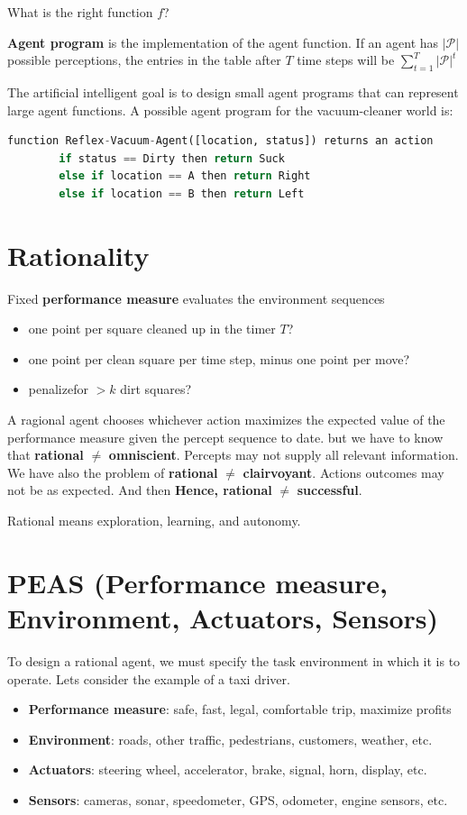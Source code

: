 What is the right function $f$?
\begin{tcolorbox}[title = {Agent Programs vs Agent functions}]
    \textbf{Agent program} is the implementation of the agent function.
    If an agent has $|\mathcal{P}|$ possible perceptions, the entries
    in the table after $T$ time steps will be 
    $
    \sum_{t=1}^{T} | \mathcal{P}|^t
    $
\end{tcolorbox}
The artificial intelligent goal is to design small agent programs that 
can represent large agent functions.
A possible agent program for the vacuum-cleaner world is:
\begin{lstlisting}[language=Python, basicstyle=\small]
    function Reflex-Vacuum-Agent([location, status]) returns an action
        if status == Dirty then return Suck
        else if location == A then return Right
        else if location == B then return Left
\end{lstlisting}
\section{Rationality}
Fixed \textbf{performance measure} evaluates the environment sequences
\begin{itemize}
    \item one point per square cleaned up in the timer $T$?
    \item one point per clean square per time step, minus one point per move?
    \item penalizefor $> k$ dirt squares?
\end{itemize}
A ragional agent chooses whichever action maximizes the expected 
value of the performance measure given the percept sequence to date.
but we have to know that \textbf{rational} $\not =$ \textbf{omniscient}. Percepts may not
supply all relevant information.
We have also the problem of \textbf{rational} $\not =$ \textbf{clairvoyant}.
Actions outcomes may not be as expected.
And then \textbf{Hence, rational} $\not =$ \textbf{successful}.

Rational means exploration, learning, and autonomy.
\section{PEAS (Performance measure, Environment, Actuators, Sensors)}
To design a rational agent, we must specify the task environment 
in which it is to operate.
Lets consider the example of a taxi driver.
\begin{itemize}
    \item \textbf{Performance measure}: safe, fast, legal, comfortable trip, maximize profits
    \item \textbf{Environment}: roads, other traffic, pedestrians, customers, weather, etc.
    \item \textbf{Actuators}: steering wheel, accelerator, brake, signal, horn, display, etc.
    \item \textbf{Sensors}: cameras, sonar, speedometer, GPS, odometer, engine sensors, etc.
\end{itemize}
